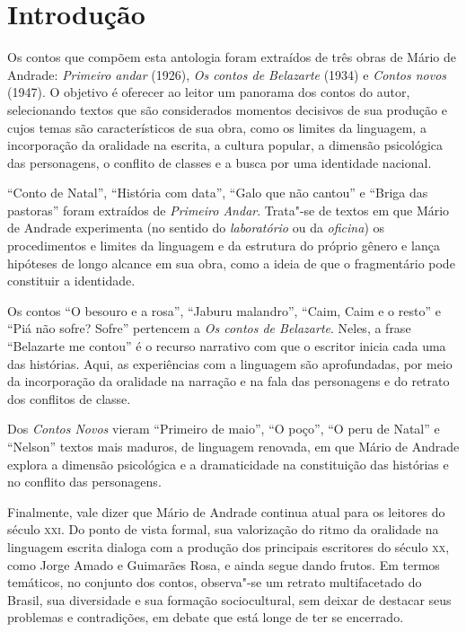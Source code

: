 \chapter{Introdução}

Os contos que compõem esta antologia foram extraídos de três obras de
Mário de Andrade: \emph{Primeiro andar} (1926), \emph{Os contos de
Belazarte} (1934) e \emph{Contos novos} (1947). O objetivo é oferecer ao
leitor um panorama dos contos do autor, selecionando textos que são
considerados momentos decisivos de sua produção e cujos temas são
característicos de sua obra, como os limites da linguagem, a
incorporação da oralidade na escrita, a cultura popular, a dimensão
psicológica das personagens, o conflito de classes e a busca por uma
identidade nacional.

``Conto de Natal'', ``História com data'', ``Galo que não cantou'' e
``Briga das pastoras'' foram extraídos de \emph{Primeiro Andar}.
Trata"-se de textos em que Mário de Andrade experimenta (no sentido do
\emph{laboratório} ou da \emph{oficina}) os procedimentos e limites da
linguagem e da estrutura do próprio gênero e lança hipóteses de longo
alcance em sua obra, como a ideia de que o fragmentário pode constituir
a identidade.

Os contos ``O besouro e a rosa'', ``Jaburu malandro'', ``Caim, Caim e o
resto'' e ``Piá não sofre? Sofre'' pertencem a \emph{Os contos de
Belazarte}. Neles, a frase ``Belazarte me contou'' é o recurso narrativo
com que o escritor inicia cada uma das histórias. Aqui, as experiências com a
linguagem são aprofundadas, por meio da incorporação da oralidade na
narração e na fala das personagens e do retrato dos conflitos de classe.

Dos \emph{Contos Novos} vieram ``Primeiro de maio'', ``O poço'', ``O
peru de Natal'' e ``Nelson'' textos mais maduros, de linguagem renovada,
em que Mário de Andrade explora a dimensão psicológica e a dramaticidade
na constituição das histórias e no conflito das personagens.

Finalmente, vale dizer que Mário de Andrade continua atual para os
leitores do século \textsc{xxi}. Do ponto de vista formal, sua valorização do
ritmo da oralidade na linguagem escrita dialoga com a produção dos
principais escritores do século \textsc{xx}, como Jorge Amado e Guimarães Rosa, e
ainda segue dando frutos. Em termos temáticos, no conjunto dos contos,
observa"-se um retrato multifacetado do Brasil, sua diversidade e sua
formação sociocultural, sem deixar de destacar seus problemas e
contradições, em debate que está longe de ter se encerrado.

